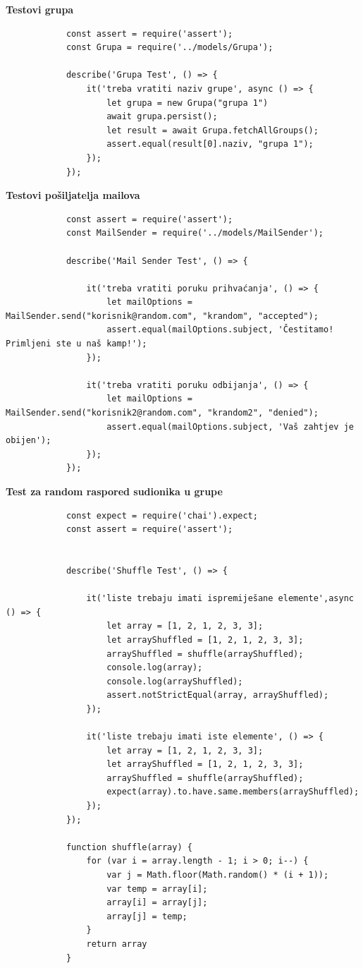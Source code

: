			\newpage
			
			
			\textbf{\large Testovi grupa}
			\begin{verbatim}
			const assert = require('assert');
			const Grupa = require('../models/Grupa');
			
			describe('Grupa Test', () => {
				it('treba vratiti naziv grupe', async () => {
					let grupa = new Grupa("grupa 1")
					await grupa.persist();
					let result = await Grupa.fetchAllGroups();
					assert.equal(result[0].naziv, "grupa 1");
				});
			});
			\end{verbatim}
			
			
			\textbf{\large Testovi pošiljatelja mailova}
			\begin{verbatim}
			const assert = require('assert');
			const MailSender = require('../models/MailSender');
			
			describe('Mail Sender Test', () => {
				
				it('treba vratiti poruku prihvaćanja', () => {
					let mailOptions = MailSender.send("korisnik@random.com", "krandom", "accepted");
					assert.equal(mailOptions.subject, 'Čestitamo! Primljeni ste u naš kamp!');
				});
				
				it('treba vratiti poruku odbijanja', () => {
					let mailOptions = MailSender.send("korisnik2@random.com", "krandom2", "denied");
					assert.equal(mailOptions.subject, 'Vaš zahtjev je obijen');
				});
			});
			\end{verbatim}
			
			\newpage
			
			\textbf{\large Test za random raspored sudionika u grupe}
			\begin{verbatim}
			const expect = require('chai').expect;
			const assert = require('assert');
			
			
			describe('Shuffle Test', () => {
				
				it('liste trebaju imati ispremiješane elemente',async () => {
					let array = [1, 2, 1, 2, 3, 3];
					let arrayShuffled = [1, 2, 1, 2, 3, 3];
					arrayShuffled = shuffle(arrayShuffled);
					console.log(array);
					console.log(arrayShuffled);
					assert.notStrictEqual(array, arrayShuffled);
				});
				
				it('liste trebaju imati iste elemente', () => {
					let array = [1, 2, 1, 2, 3, 3];
					let arrayShuffled = [1, 2, 1, 2, 3, 3];
					arrayShuffled = shuffle(arrayShuffled);
					expect(array).to.have.same.members(arrayShuffled);
				});
			});
			
			function shuffle(array) {
				for (var i = array.length - 1; i > 0; i--) {
					var j = Math.floor(Math.random() * (i + 1));
					var temp = array[i];
					array[i] = array[j];
					array[j] = temp;
				}
				return array
			}
			\end{verbatim}
		
